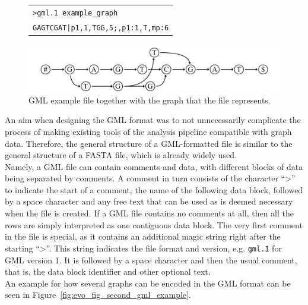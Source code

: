 \documentclass[a4paper,12pt,twoside,BCOR=10mm]{scrbook}
\begin{document}
\begin{figure}[!htb]
\centering
\begin{tabularx}{1.0\textwidth}{ | X | }
\hline
\texttt{>gml.1 example\_graph} \\
\texttt{GAGTCGAT|p1,1,TGG,5;,p1:1,T,mp:6} \\
\hline
\end{tabularx}
\includegraphics[width=\textwidth]{evo_fig_first_gml_example.pdf}
\caption[GML example file]{GML example file together with the graph that the file represents.} \label{fig:evo_fig_first_gml_example}
\end{figure}

An aim when designing the GML format was to not unnecessarily complicate the process of
making existing tools of the analysis pipeline
compatible with graph data.
Therefore, the general structure of a GML-formatted file is similar to the general structure
of a FASTA file, which is already widely used. \\
Namely, a GML file can contain comments and data, with different blocks of data being separated
by comments. A comment in turn consists of the character “>” to indicate the start of a comment,
the name of the following data block, followed by a space character and any free text that
can be used as is deemed necessary when the file is created.
If a GML file contains no comments at all,
then all the rows are simply interpreted as one contiguous data block.
The very first comment in the file is special,
as it contains an additional magic string right after the starting “>”.
This string indicates the
file format and version, e.g. \texttt{gml.1} for GML version 1.
It is followed by a space character and then the usual comment, that is, the data block identifier
and other optional text. \\
An example for how several graphs can be encoded in the GML format
can be seen in Figure~\ref{fig:evo_fig_second_gml_example}.
\end{document}
